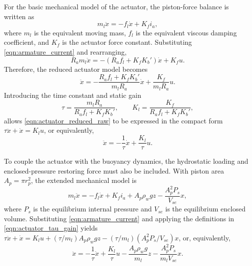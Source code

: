 ﻿\documentclass[subscriptcorrection,upint,varvw,barcolor=Goldenrod3,mathalfa=cal=euler,balance,hyphenate,french,pdf-a]{asmejour}
\begin{document}
For the basic mechanical model of the actuator, the piston-force balance is written as
\[
    m_l \ddot{x} = -f_l\dot{x} + K_f i_a,
\]
where $m_l$ is the equivalent moving mass, $f_l$ is the equivalent viscous damping coefficient, and $K_f$ is the actuator force constant. Substituting \eqref{eqn:armature_current} and rearranging,
\[
    R_a m_l\ddot{x} = -\left(R_a f_l + K_f K_b'\right)\dot{x} + K_f u.
\]
Therefore, the reduced actuator model becomes
\begin{equation}
    \ddot{x} = -\frac{R_a f_l + K_f K_b'}{m_l R_a}\dot{x} + \frac{K_f}{m_l R_a}u.
    \label{eqn:actuator_reduced_raw}
\end{equation}
Introducing the time constant and static gain
\begin{equation}
    \tau = \frac{m_l R_a}{R_a f_l + K_f K_b'},
    \qquad
    K_l = \frac{K_f}{R_a f_l + K_f K_b'},
    \label{eqn:actuator_tau_gain}
\end{equation}
allows \eqref{eqn:actuator_reduced_raw} to be expressed in the compact form $\tau\ddot{x} + \dot{x} = K_l u$, or equivalently,
\begin{equation}
    \ddot{x} = -\frac{1}{\tau}\dot{x} + \frac{K_l}{\tau}u.
    \label{eqn:actuator_reduced}
\end{equation}

To couple the actuator with the buoyancy dynamics, the hydrostatic loading and enclosed-pressure restoring force must also be included. With piston area $A_p = \pi r_p^2$, the extended mechanical model is
\[
    m_l\ddot{x} = -f_l\dot{x} + K_f i_a + A_p\rho_w g z - \frac{A_p^2P_s}{V_{se}}x,
\]
where $P_s$ is the equilibrium internal pressure and $V_{se}$ is the equilibrium enclosed volume. Substituting \eqref{eqn:armature_current} and applying the definitions in \eqref{eqn:actuator_tau_gain} yields $\tau\ddot{x} + \dot{x} = K_l u + (\tau/m_l)A_p\rho_w g z - (\tau/m_l)(A_p^2P_s/V_{se})x$, or, equivalently,
\begin{equation}
    \ddot{x} = -\frac{1}{\tau}\dot{x} + \frac{K_l}{\tau}u - \frac{A_p\rho_w g}{m_l}z - \frac{A_p^2P_s}{m_lV_{se}}x.
    \label{eqn:actuator_extended}
\end{equation}
\end{document}
